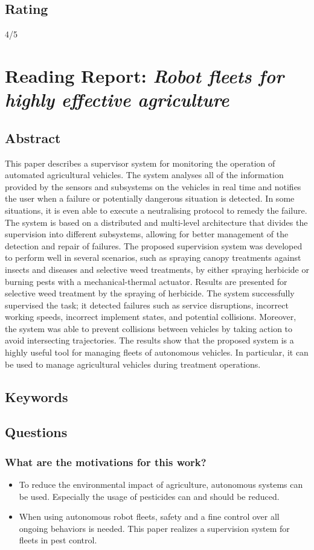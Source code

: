 \documentclass{article}
\begin{document}
\subsection*{Rating}
4/5
\section{Reading Report: \emph{Robot fleets for highly effective agriculture}}
\cite{ConesaMunoz2015}

\subsection*{Abstract}
This paper describes a supervisor system for monitoring the operation of automated
agricultural vehicles. The system analyses all of the information provided by the sensors and
subsystems on the vehicles in real time and notifies the user when a failure or potentially
dangerous situation is detected. In some situations, it is even able to execute a neutralising
protocol to remedy the failure. The system is based on a distributed and multi-level architecture
that divides the supervision into different subsystems, allowing for better management of the
detection and repair of failures. The proposed supervision system was developed to perform
well in several scenarios, such as spraying canopy treatments against insects and diseases
and selective weed treatments, by either spraying herbicide or burning pests with a
mechanical-thermal actuator. Results are presented for selective weed treatment by the
spraying of herbicide. The system successfully supervised the task; it detected failures such
as service disruptions, incorrect working speeds, incorrect implement states, and potential
collisions. Moreover, the system was able to prevent collisions between vehicles by taking
action to avoid intersecting trajectories. The results show that the proposed system is a highly
useful tool for managing fleets of autonomous vehicles. In particular, it can be used to
manage agricultural vehicles during treatment operations.

\subsection*{Keywords}

\subsection*{Questions}
\subsubsection*{What are the motivations for this work?}
\begin{itemize}
    \item To reduce the environmental impact of agriculture, autonomous systems can be used. Especially the usage of pesticides can and should be reduced. 
    \item When using autonomous robot fleets, safety and a fine control over all ongoing behaviors is needed. This paper realizes a supervision system for fleets in pest control.
\end{itemize}
\end{document}
